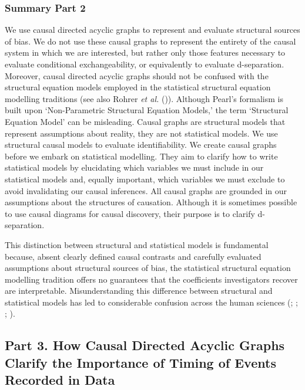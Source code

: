 \documentclass[
  single column]{article}
\begin{document}
\newpage{}

\subsubsection{Summary Part 2}\label{summary-part-2}

We use causal directed acyclic graphs to represent and evaluate
structural sources of bias. We do not use these causal graphs to
represent the entirety of the causal system in which we are interested,
but rather only those features necessary to evaluate conditional
exchangeability, or equivalently to evaluate d-separation. Moreover,
causal directed acyclic graphs should not be confused with the
structural equation models employed in the statistical structural
equation modelling traditions (see also Rohrer \emph{et al.}
()). Although Pearl's formalism is
built upon `Non-Parametric Structural Equation Models,' the term
`Structural Equation Model' can be misleading. Causal graphs are
structural models that represent assumptions about reality, they are not
statistical models. We use structural causal models to evaluate
identifiability. We create causal graphs before we embark on statistical
modelling. They aim to clarify how to write statistical models by
elucidating which variables we must include in our statistical models
and, equally important, which variables we must exclude to avoid
invalidating our causal inferences. All causal graphs are grounded in
our assumptions about the structures of causation. Although it is
sometimes possible to use causal diagrams for causal discovery, their
purpose is to clarify d-separation.

This distinction between structural and statistical models is
fundamental because, absent clearly defined causal contrasts and
carefully evaluated assumptions about structural sources of bias, the
statistical structural equation modelling tradition offers no guarantees
that the coefficients investigators recover are interpretable.
Misunderstanding this difference between structural and statistical
models has led to considerable confusion across the human sciences
(;
;
;
).

\subsection{Part 3. How Causal Directed Acyclic Graphs Clarify the
Importance of Timing of Events Recorded in Data}\label{id-sec-3}
\end{document}

